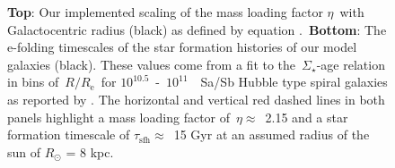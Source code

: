 \documentclass[draft2.tex]{subfiles}
\begin{document}
\begin{figure}
\caption{\textbf{Top}: Our implemented scaling of the mass loading factor 
$\eta$~with Galactocentric radius (black) as defined by equation 
.~\textbf{Bottom}: The e-folding timescales of the star 
formation histories of our model galaxies (black). These values come from a 
fit to the~$\Sigma_\star$-age relation in bins of~$R/R_\text{e}$~for 
$10^{10.5}$~-~$10^{11}$~\msun~Sa/Sb Hubble type spiral galaxies as reported by 
\citet[][see discussion in~\S~\ref{sec:methods:sfhs}]{Sanchez2020}. The 
horizontal and vertical red dashed lines in both panels highlight a mass 
loading factor of~$\eta \approx$~2.15 and a star formation timescale of 
$\tau_\text{sfh} \approx$~15 Gyr at an assumed radius of the sun of 
$R_\odot$ = 8 kpc. } 
\label{fig:eta_tau_sfh} 
\end{figure} 
\end{document}
